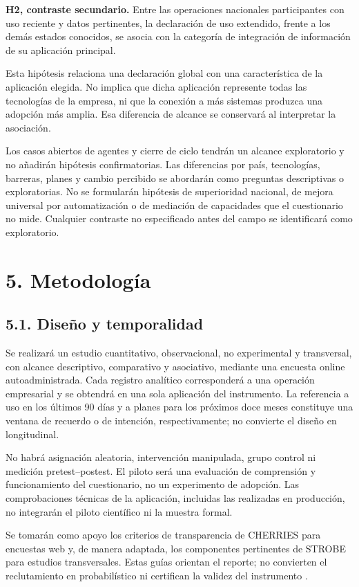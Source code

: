 \documentclass[12pt,letterpaper]{article}
\begin{document}
\textbf{H2, contraste secundario.} Entre las operaciones nacionales participantes con uso reciente y datos pertinentes, la declaración de uso extendido, frente a los demás estados conocidos, se asocia con la categoría de integración de información de su aplicación principal.

Esta hipótesis relaciona una declaración global con una característica de la aplicación elegida. No implica que dicha aplicación represente todas las tecnologías de la empresa, ni que la conexión a más sistemas produzca una adopción más amplia. Esa diferencia de alcance se conservará al interpretar la asociación.

Los casos abiertos de agentes y cierre de ciclo tendrán un alcance exploratorio y no añadirán hipótesis confirmatorias. Las diferencias por país, tecnologías, barreras, planes y cambio percibido se abordarán como preguntas descriptivas o exploratorias. No se formularán hipótesis de superioridad nacional, de mejora universal por automatización o de mediación de capacidades que el cuestionario no mide. Cualquier contraste no especificado antes del campo se identificará como exploratorio.

\section*{5. Metodología}
\subsection*{5.1. Diseño y temporalidad}
Se realizará un estudio cuantitativo, observacional, no experimental y transversal, con alcance descriptivo, comparativo y asociativo, mediante una encuesta online autoadministrada. Cada registro analítico corresponderá a una operación empresarial y se obtendrá en una sola aplicación del instrumento. La referencia a uso en los últimos 90 días y a planes para los próximos doce meses constituye una ventana de recuerdo o de intención, respectivamente; no convierte el diseño en longitudinal.

No habrá asignación aleatoria, intervención manipulada, grupo control ni medición pretest--postest. El piloto será una evaluación de comprensión y funcionamiento del cuestionario, no un experimento de adopción. Las comprobaciones técnicas de la aplicación, incluidas las realizadas en producción, no integrarán el piloto científico ni la muestra formal.

Se tomarán como apoyo los criterios de transparencia de CHERRIES para encuestas web y, de manera adaptada, los componentes pertinentes de STROBE para estudios transversales. Estas guías orientan el reporte; no convierten el reclutamiento en probabilístico ni certifican la validez del instrumento \citep{eysenbach,strobe}.
\end{document}
